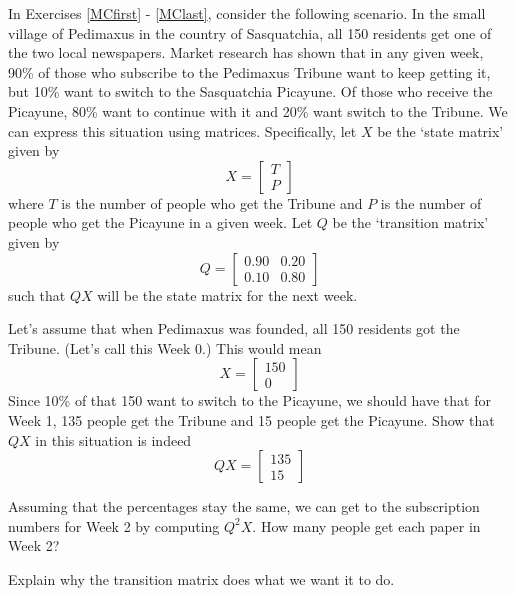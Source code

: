 \documentclass{ximera}
\begin{document}
\begin{question}\label{Markovchain} 
In Exercises \ref{MCfirst} - \ref{MClast}, consider the following scenario. In the small village of Pedimaxus in the country of Sasquatchia, all 150 residents get one of the two local newspapers.  Market research has shown that in any given week, 90\% of those who subscribe to the Pedimaxus Tribune want to keep getting it, but 10\% want to switch to the Sasquatchia Picayune.  Of those who receive the Picayune, 80\% want to continue with it and 20\% want switch to the Tribune.  We can express this situation using matrices.  Specifically, let $X$ be the `state matrix' given by \[X = \left[ \begin{array}{r} T \\ P \end{array} \right]\] where $T$ is the number of people who get the Tribune and $P$ is the number of people who get the Picayune in a given week.  Let $Q$ be the `transition matrix' given by \[Q = \left[ \begin{array}{rr} 0.90 & 0.20 \\ 0.10 & 0.80 \end{array} \right]\] such that $QX$ will be the state matrix for the next week. 

\begin{problem}\label{MCfirst}
Let's assume that when Pedimaxus was founded, all 150 residents got the Tribune.  (Let's call this Week 0.) This would mean \[X = \left[ \begin{array}{r} 150 \\ 0 \end{array} \right]\] Since 10\% of that 150 want to switch to the Picayune, we should have that for Week 1, 135 people get the Tribune and 15 people get the Picayune.  Show that $QX$ in this situation is indeed \[QX = \left[ \begin{array}{r} 135 \\ 15 \end{array} \right]\]
\end{problem}

\begin{problem}
Assuming that the percentages stay the same, we can get to the subscription numbers for Week 2 by computing $Q^{2}X$. How many people get each paper in Week 2?
\end{problem}

\begin{problem}
Explain why the transition matrix does what we want it to do.
\end{problem}


\end{question}
\end{document}
